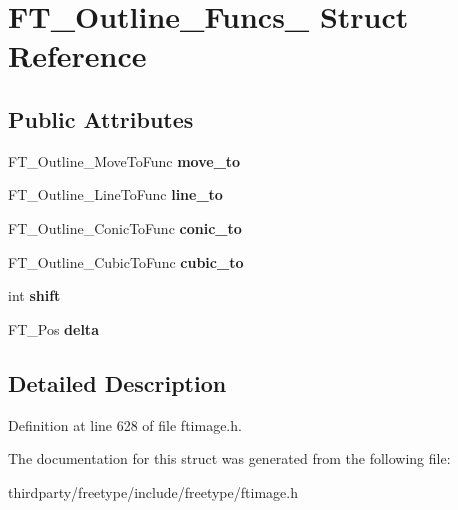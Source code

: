\hypertarget{struct_f_t___outline___funcs__}{}\section{F\+T\+\_\+\+Outline\+\_\+\+Funcs\+\_\+ Struct Reference}
\label{struct_f_t___outline___funcs__}
\subsection*{Public Attributes}
\begin{DoxyCompactItemize}
\item 
\mbox{\label{struct_f_t___outline___funcs___abd53463a59a1ae2c6998e619c2ab6a65}} 
F\+T\+\_\+\+Outline\+\_\+\+Move\+To\+Func {\bfseries move\+\_\+to}
\item 
\mbox{\label{struct_f_t___outline___funcs___a876fc8ca7541786cd3c4ec3806f88360}} 
F\+T\+\_\+\+Outline\+\_\+\+Line\+To\+Func {\bfseries line\+\_\+to}
\item 
\mbox{\label{struct_f_t___outline___funcs___a09681f5a64189066d3fba3cf398a135b}} 
F\+T\+\_\+\+Outline\+\_\+\+Conic\+To\+Func {\bfseries conic\+\_\+to}
\item 
\mbox{\label{struct_f_t___outline___funcs___aa3e0c1bacb181a5f43c104ab7f72cfda}} 
F\+T\+\_\+\+Outline\+\_\+\+Cubic\+To\+Func {\bfseries cubic\+\_\+to}
\item 
\mbox{\label{struct_f_t___outline___funcs___a540c246669b21b86cb405b3d9019cfda}} 
int {\bfseries shift}
\item 
\mbox{\label{struct_f_t___outline___funcs___a3c3121398b3ff564b4f3fd5b2a318e5e}} 
F\+T\+\_\+\+Pos {\bfseries delta}
\end{DoxyCompactItemize}


\subsection{Detailed Description}


Definition at line 628 of file ftimage.\+h.



The documentation for this struct was generated from the following file\+:\begin{DoxyCompactItemize}
\item 
thirdparty/freetype/include/freetype/ftimage.\+h\end{DoxyCompactItemize}
